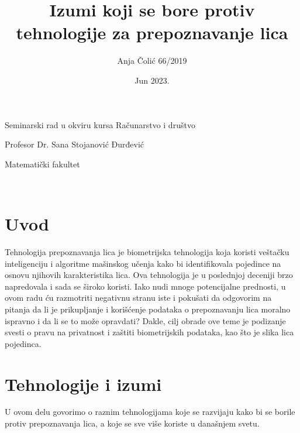 \documentclass{article}
\title{Izumi koji se bore protiv tehnologije za prepoznavanje lica}
\author{Anja Čolić 66/2019}
\date{Jun 2023.}
\newcommand{\profesor}{Profesor Dr. Sana Stojanović Đurđević}
\newcommand{\fakultet}{Matematički fakultet}
\newcommand{\kurs}{Seminarski rad u okviru kursa Računarstvo i društvo}
\begin{document}

\maketitle


\begin{center}
\kurs
\end{center}
\begin{center}
\profesor
\end{center}
\begin{center}
\fakultet
\end{center}


\newpage
{}
\renewcommand{\contentsname}{Sadržaj}
\tableofcontents
\newpage

\





\maketitle

\section{Uvod}

Tehnologija prepoznavanja lica je biometrijska tehnologija koja koristi veštačku inteligenciju i algoritme mašinskog učenja kako bi identifikovala pojedince na osnovu njihovih karakteristika lica. 
\newline
\newline
Ova tehnologija je u poslednjoj deceniji brzo napredovala i sada se široko koristi.
Iako nudi mnoge potencijalne prednosti, u ovom radu ću razmotriti negativnu stranu iste i pokušati da odgovorim na pitanja da li je prikupljanje i korišćenje podataka o prepoznavanju lica moralno ispravno i da li se to može opravdati?
\newline
\newline
Dakle, cilj obrade ove teme je podizanje svesti o pravu na privatnost i zaštiti biometrijskih podataka, kao što je slika lica pojedinca.
\newpage

\section{Tehnologije i izumi}

U ovom delu govorimo o raznim tehnologijama koje se razvijaju kako bi se borile protiv prepoznavanja lica, a koje se sve više koriste u današnjem svetu. 
\end{document}
